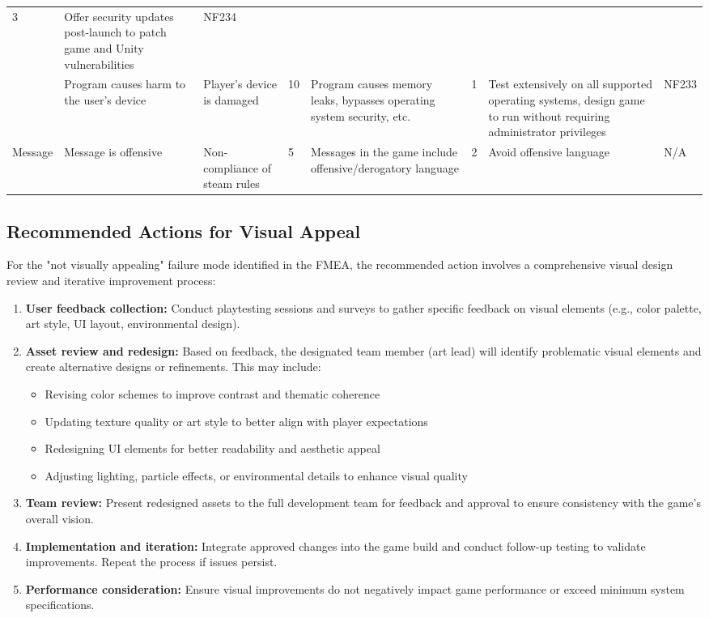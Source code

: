\documentclass{article}
\begin{document}
\begin{table}[H]
\begin{tabular}{|p{2.25cm}|p{1.25cm}|p{2.25cm}|p{1.25cm}|p{2.5cm}|p{1.65cm}|p{2.5cm}|p{0.75cm}|}
  3 &
  Offer security updates post-launch to patch game and Unity vulnerabilities &
  NF234 \\ \cline{2-8} 
\multicolumn{1}{|l|}{} &
  Program causes harm to the user's device &
  Player's device is damaged &
  10 &
  Program causes memory leaks, bypasses  operating system security, etc. &
  1 &
  Test extensively on all supported operating systems, design game to run  without requiring administrator privileges &
  NF233 \\ \hline
\multicolumn{1}{|l|}{Message} &
  Message is offensive &
  Non-compliance of steam rules &
  5 &
  Messages in the game include  offensive/derogatory language &
  2 &
  Avoid offensive language &
  N/A \\ \hline
\end{tabular}%
\end{table}

\subsection{Recommended Actions for Visual Appeal}

For the "not visually appealing" failure mode identified in the FMEA, the recommended action involves a comprehensive visual design review and iterative improvement process:

\begin{enumerate}
\item{\textbf{User feedback collection:} Conduct playtesting sessions and surveys to gather specific feedback on visual elements (e.g., color palette, art style, UI layout, environmental design).}
\item{\textbf{Asset review and redesign:} Based on feedback, the designated team member (art lead) will identify problematic visual elements and create alternative designs or refinements. This may include:
\begin{itemize}
\item{Revising color schemes to improve contrast and thematic coherence}
\item{Updating texture quality or art style to better align with player expectations}
\item{Redesigning UI elements for better readability and aesthetic appeal}
\item{Adjusting lighting, particle effects, or environmental details to enhance visual quality}
\end{itemize}}
\item{\textbf{Team review:} Present redesigned assets to the full development team for feedback and approval to ensure consistency with the game's overall vision.}
\item{\textbf{Implementation and iteration:} Integrate approved changes into the game build and conduct follow-up testing to validate improvements. Repeat the process if issues persist.}
\item{\textbf{Performance consideration:} Ensure visual improvements do not negatively impact game performance or exceed minimum system specifications.}
\end{enumerate}
\end{document}
